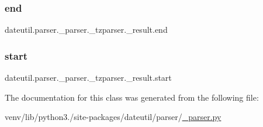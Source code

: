 \subsubsection{\texorpdfstring{end}{end}}
{\footnotesize\ttfamily dateutil.\+parser.\+\_\+parser.\+\_\+tzparser.\+\_\+result.\+end}

\mbox{\label{classdateutil_1_1parser_1_1__parser_1_1__tzparser_1_1__result_a4c70bcaa2401543df57b44de0ad3188f}} 
\subsubsection{\texorpdfstring{start}{start}}
{\footnotesize\ttfamily dateutil.\+parser.\+\_\+parser.\+\_\+tzparser.\+\_\+result.\+start}



The documentation for this class was generated from the following file\+:\begin{DoxyCompactItemize}
\item 
venv/lib/python3./site-\/packages/dateutil/parser/\hyperlink{dateutil_2parser_2__parser_8py}{\+\_\+parser.\+py}\end{DoxyCompactItemize}
